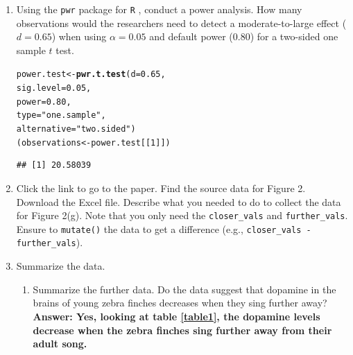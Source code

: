 \documentclass{article}\usepackage[]{graphicx}\usepackage[]{xcolor}
\makeatletter
\newcommand{\hlnum}[1]{\textcolor[rgb]{0.686,0.059,0.569}{#1}}%
\newcommand{\hlsng}[1]{\textcolor[rgb]{0.192,0.494,0.8}{#1}}%
\newcommand{\hldef}[1]{\textcolor[rgb]{0.345,0.345,0.345}{#1}}%
\newcommand{\hlkwb}[1]{\textcolor[rgb]{0.69,0.353,0.396}{#1}}%
\newcommand{\hlkwc}[1]{\textcolor[rgb]{0.333,0.667,0.333}{#1}}%
\newcommand{\hlkwd}[1]{\textcolor[rgb]{0.737,0.353,0.396}{\textbf{#1}}}%
\newenvironment{kframe}{%
 \def\at@end@of@kframe{}%
 \ifinner\ifhmode%
  \def\at@end@of@kframe{\end{minipage}}%
  \begin{minipage}{\columnwidth}%
 \fi\fi%
 \def\FrameCommand##1{\hskip\@totalleftmargin \hskip-\fboxsep
 \colorbox{shadecolor}{##1}\hskip-\fboxsep
     \hskip-\linewidth \hskip-\@totalleftmargin \hskip\columnwidth}%
 \MakeFramed {\advance\hsize-\width
   \@totalleftmargin\z@ \linewidth\hsize
   \@setminipage}}%
 {\par\unskip\endMakeFramed%
 \at@end@of@kframe}
\newenvironment{knitrout}{}{} %
\makeatother
\begin{document}
\begin{enumerate}
\item Using the \texttt{pwr} package for \texttt{R} \citep{pwr},
conduct a power analysis. How many observations would the researchers 
need to detect a moderate-to-large effect ($d=0.65$) when using 
$\alpha=0.05$ and default power (0.80) for a two-sided one sample 
$t$ test.


\begin{knitrout}\scriptsize
{}\color{fgcolor}\begin{kframe}
\begin{alltt}
\hldef{power.test} \hlkwb{<-} \hlkwd{pwr.t.test}\hldef{(}\hlkwc{d} \hldef{=} \hlnum{0.65}\hldef{,}
           \hlkwc{sig.level} \hldef{=} \hlnum{0.05}\hldef{,}
           \hlkwc{power} \hldef{=} \hlnum{0.80}\hldef{,}
           \hlkwc{type} \hldef{=} \hlsng{"one.sample"}\hldef{,}
           \hlkwc{alternative} \hldef{=} \hlsng{"two.sided"}\hldef{)}
\hldef{(observations} \hlkwb{<-} \hldef{power.test[[}\hlnum{1}\hldef{]])}
\end{alltt}
\begin{verbatim}
## [1] 20.58039
\end{verbatim}
\end{kframe}
\end{knitrout}

\item Click the link to go to the paper. Find the source data for 
Figure 2. Download the Excel file. Describe what you needed to
do to collect the data for Figure 2(g). Note that you only need the 
\texttt{closer\_vals} and \texttt{further\_vals}. Ensure to 
\texttt{mutate()} the data to get a difference 
(e.g., \texttt{closer\_vals - further\_vals}).


\item Summarize the data.
\begin{enumerate}
  \item Summarize the further data. Do the data suggest that
   dopamine in the brains of young zebra finches decreases when
   they sing further away? \newline
   \textbf{Answer: Yes, looking at table \ref{table1}, the dopamine levels decrease when the zebra finches sing further away from their adult song.}
  

\end{enumerate}
\end{enumerate}
\end{document}
